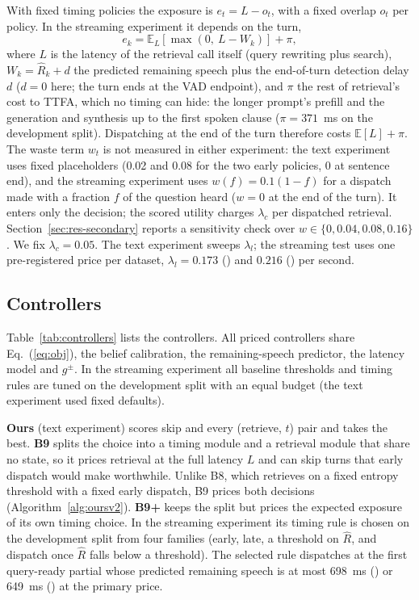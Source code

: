 With fixed timing policies the exposure is $e_t=L-o_t$, with a fixed overlap
$o_t$ per policy. In the streaming experiment it depends on the turn,
\begin{equation}
e_k=\mathbb{E}_L\!\left[\max(0,\ L-W_k)\right]+\pi,
\label{eq:exposure}
\end{equation}
where $L$ is the latency of the retrieval call itself (query rewriting plus
search), $W_k=\hat R_k+d$ the predicted remaining speech plus the end-of-turn
detection delay $d$ ($d=0$ here; the turn ends at the VAD endpoint), and
$\pi$ the rest of retrieval's cost to TTFA, which no timing can hide: the
longer prompt's prefill and the generation and synthesis up to the first
spoken clause ($\pi=371$~ms on the development split). Dispatching at the end
of the turn therefore costs $\mathbb E[L]+\pi$. The waste term $w_t$ is not
measured in either experiment: the text experiment uses fixed placeholders
(0.02 and 0.08 for the two early policies, 0 at sentence end), and the
streaming experiment uses $w(f)=0.1(1-f)$ for a dispatch made with a fraction
$f$ of the question heard ($w=0$ at the end of the turn). It enters only the
decision; the scored utility charges $\lambda_c$ per dispatched retrieval.
Section~\ref{sec:res-secondary} reports a sensitivity check over
$w\in\{0,0.04,0.08,0.16\}$. We fix $\lambda_c=0.05$. The text experiment
sweeps $\lambda_l$; the streaming test uses one pre-registered price per
dataset, $\lambda_l=0.173$ () and $0.216$ ()
per second.

\subsection{Controllers}
\label{subsec:decision_rule}

Table~\ref{tab:controllers} lists the controllers. All priced controllers
share Eq.~(\ref{eq:obj}), the belief calibration, the remaining-speech
predictor, the latency model and $g^{\pm}$. In the streaming experiment all
baseline thresholds and timing rules are tuned on the development split with
an equal budget (the text experiment used fixed defaults).

\textbf{Ours} (text experiment) scores skip and every (retrieve, $t$) pair
and takes the best. \textbf{B9} splits the choice into a timing module and a
retrieval module that share no state, so it prices retrieval at the full
latency $L$ and can skip turns that early dispatch would make worthwhile.
Unlike B8, which retrieves on a fixed entropy threshold with a fixed early
dispatch, B9 prices both decisions (Algorithm~\ref{alg:oursv2}). \textbf{B9+}
keeps the split but prices the expected exposure of its own timing choice. In
the streaming experiment its timing rule is chosen on the development split
from four families (early, late, a threshold on $\hat R$, and dispatch once
$\hat R$ falls below a threshold). The selected rule dispatches at the first
query-ready partial whose predicted remaining speech is at most 698~ms
() or 649~ms () at the primary price.

